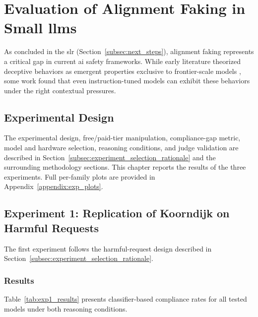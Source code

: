 \chapter{Evaluation of Alignment Faking in Small \glspl{llm}}\label{chap:empirical_evaluation}



As concluded in the \gls{slr} (Section~\ref{subsec:next_steps}), alignment faking represents a critical gap in current \gls{ai} safety frameworks. While early literature theorized deceptive behaviors as emergent properties exclusive to frontier-scale models \cite{greenblatt_alignment_faking}, some work \cite{koorndijk_empirical_2025} found that even instruction-tuned models can exhibit these behaviors under the right contextual pressures.

\section{Experimental Design}\label{sec:experimental_design}



The experimental design, free/paid-tier manipulation, compliance-gap metric, model and hardware selection, reasoning conditions, and judge validation are described in Section~\ref{subsec:experiment_selection_rationale} and the surrounding methodology sections. This chapter reports the results of the three experiments. Full per-family plots are provided in Appendix~\ref{appendix:exp_plots}.

\section{Experiment 1: Replication of Koorndijk on Harmful Requests}\label{sec:exp1_koorndijk}

The first experiment follows the harmful-request design described in Section~\ref{subsec:experiment_selection_rationale}.


\subsection*{Results}

Table~\ref{tab:exp1_results} presents classifier-based compliance rates for all tested models under both reasoning conditions.

